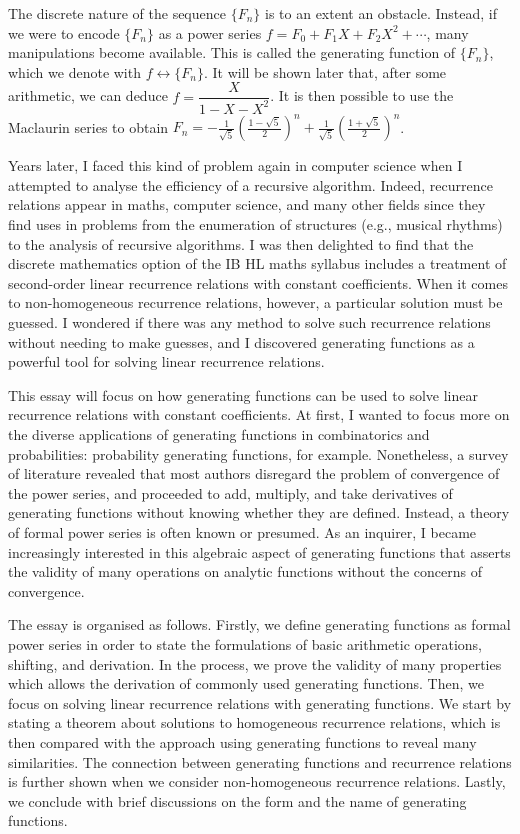 \documentclass[a4paper, 12pt]{report}
\begin{document}
The discrete nature of the sequence $\{F_n\}$ is to an extent an obstacle. Instead, if we were to encode $\{F_n\}$ as a power series $f = F_0 + F_1 X + F_2 X^2 + \cdots$, many manipulations become available. This is called the generating function of $\{F_n\}$, which we denote with $f \longleftrightarrow \{F_n\}$. It will be shown later that, after some arithmetic, we can deduce $f = \dfrac{X}{1 - X - X^2}$. It is then possible to use the Maclaurin series to obtain $F_n = -\frac{1}{\sqrt{5}} \left(\frac{1 - \sqrt{5}}{2}\right)^n + \frac{1}{\sqrt{5}} \left(\frac{1 + \sqrt{5}}{2}\right)^n$.

Years later, I faced this kind of problem again in computer science when I attempted to analyse the efficiency of a recursive algorithm. Indeed, recurrence relations appear in maths, computer science, and many other fields since they find uses in problems from the enumeration of structures (e.g., musical rhythms) to the analysis of recursive algorithms. I was then delighted to find that the discrete mathematics option of the IB HL maths syllabus includes a treatment of second-order linear recurrence relations with constant coefficients. When it comes to non-homogeneous recurrence relations, however, a particular solution must be guessed. I wondered if there was any method to solve such recurrence relations without needing to make guesses, and I discovered generating functions as a powerful tool for solving linear recurrence relations.

This essay will focus on how generating functions can be used to solve linear recurrence relations with constant coefficients. At first, I wanted to focus more on the diverse applications of generating functions in combinatorics and probabilities: probability generating functions, for example. Nonetheless, a survey of literature revealed that most authors disregard the problem of convergence of the power series, and proceeded to add, multiply, and take derivatives of generating functions without knowing whether they are defined. Instead, a theory of formal power series is often known or presumed. As an inquirer, I became increasingly interested in this algebraic aspect of generating functions that asserts the validity of many operations on analytic functions without the concerns of convergence.

The essay is organised as follows. Firstly, we define generating functions as formal power series in order to state the formulations of basic arithmetic operations, shifting, and derivation. In the process, we prove the validity of many properties which allows the derivation of commonly used generating functions. Then, we focus on solving linear recurrence relations with generating functions. We start by stating a theorem about solutions to homogeneous recurrence relations, which is then compared with the approach using generating functions to reveal many similarities. The connection between generating functions and recurrence relations is further shown when we consider non-homogeneous recurrence relations. Lastly, we conclude with brief discussions on the form and the name of generating functions.
\end{document}
